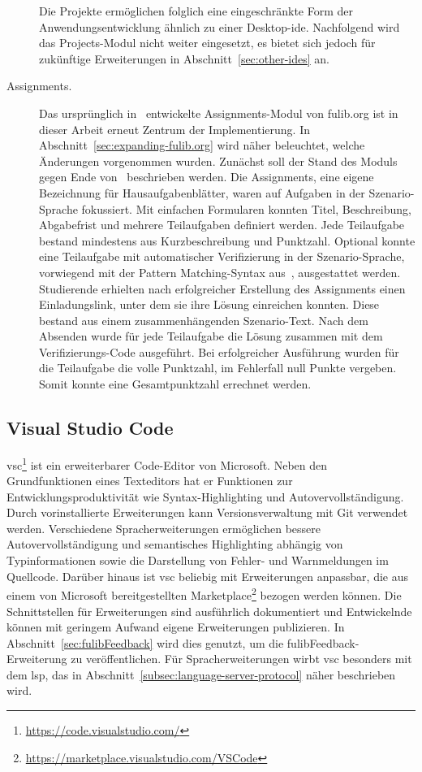 \begin{description}
    Die Projekte ermöglichen folglich eine eingeschränkte Form der Anwendungsentwicklung ähnlich zu einer Desktop-\ac{ide}.
    Nachfolgend wird das Projects-Modul nicht weiter eingesetzt, es bietet sich jedoch für zukünftige Erweiterungen in Abschnitt~\ref{sec:other-ides} an.
    \item[Assignments.]
    Das ursprünglich in~\cite{bachelor-thesis} entwickelte Assignments-Modul von fulib.org ist in dieser Arbeit erneut Zentrum der Implementierung.
    In Abschnitt~\ref{sec:expanding-fulib.org} wird näher beleuchtet, welche Änderungen vorgenommen wurden.
    Zunächst soll der Stand des Moduls gegen Ende von~\cite{bachelor-thesis} beschrieben werden.
    Die Assignments, eine eigene Bezeichnung für Hausaufgabenblätter, waren auf Aufgaben in der Szenario-Sprache fokussiert.
    Mit einfachen Formularen konnten Titel, Beschreibung, Abgabefrist und mehrere Teilaufgaben definiert werden.
    Jede Teilaufgabe bestand mindestens aus Kurzbeschreibung und Punktzahl.
    Optional konnte eine Teilaufgabe mit automatischer Verifizierung in der Szenario-Sprache, vorwiegend mit der Pattern Matching-Syntax aus~\cite{bachelor-thesis}, ausgestattet werden.
    Studierende erhielten nach erfolgreicher Erstellung des Assignments einen Einladungslink, unter dem sie ihre Lösung einreichen konnten.
    Diese bestand aus einem zusammenhängenden Szenario-Text.
    Nach dem Absenden wurde für jede Teilaufgabe die Lösung zusammen mit dem Verifizierungs-Code ausgeführt.
    Bei erfolgreicher Ausführung wurden für die Teilaufgabe die volle Punktzahl, im Fehlerfall null Punkte vergeben.
    Somit konnte eine Gesamtpunktzahl errechnet werden.
\end{description}

\subsection{Visual Studio Code}\label{subsec:visual-studio-code}

\ac{vsc}\footnote{\url{https://code.visualstudio.com/}} ist ein erweiterbarer Code-Editor von Microsoft.
Neben den Grundfunktionen eines Texteditors hat er Funktionen zur Entwicklungsproduktivität wie Syntax-Highlighting und Autovervollständigung.
Durch vorinstallierte Erweiterungen kann Versionsverwaltung mit Git verwendet werden.
Verschiedene Spracherweiterungen ermöglichen bessere Autovervollständigung und semantisches Highlighting abhängig von Typinformationen sowie die Darstellung von Fehler- und Warnmeldungen im Quellcode.
Darüber hinaus ist \ac{vsc} beliebig mit Erweiterungen anpassbar, die aus einem von Microsoft bereitgestellten Marketplace\footnote{\url{https://marketplace.visualstudio.com/VSCode}} bezogen werden können.
Die Schnittstellen für Erweiterungen sind ausführlich dokumentiert und Entwickelnde können mit geringem Aufwand eigene Erweiterungen publizieren.
In Abschnitt~\ref{sec:fulibFeedback} wird dies genutzt, um die fulibFeedback-Erweiterung zu veröffentlichen.
Für Spracherweiterungen wirbt \ac{vsc} besonders mit dem \ac{lsp}, das in Abschnitt~\ref{subsec:language-server-protocol} näher beschrieben wird.

